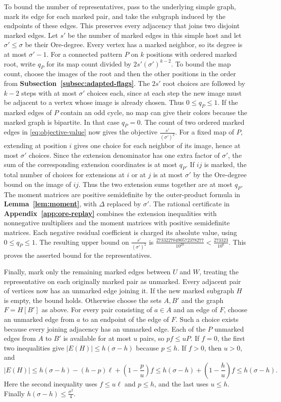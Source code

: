 \documentclass[preprint,11pt,numbers]{elsarticle-arxiv}
\numberwithin{equation}{section}
\theoremstyle{definition}
\begin{document}
To bound the number of representatives, pass to the underlying simple
graph, mark its edge for each marked pair, and take the subgraph
induced by the endpoints of these edges.
This preserves every adjacency that joins two disjoint marked edges.
Let $s'$ be the number of marked edges in this simple host and let
$\sigma'\leq\sigma$ be their Ore-degree. Every vertex has a marked
neighbor, so its degree is at most $\sigma'-1$. For a connected
pattern $P$ on $k$ positions with ordered marked root, write $q_P$
for its map count divided by $2s'(\sigma')^{k-2}$. To bound the map
count, choose the images of the root and then the other positions in
the order from \textbf{Subsection~\ref{subsec:adapted-flags}}.
The $2s'$ root choices are followed by $k-2$ steps with at most
$\sigma'$ choices each, since at each step the new image must be
adjacent to a vertex whose image is already chosen. Thus
$0\leq q_P\leq1$. If the marked edges of $P$ contain an odd cycle,
no map can give their colors because the marked graph is bipartite.
In that case $q_P=0$.
The count of two ordered marked edges in \eqref{eq:objective-value}
now gives the objective $\frac{s'}{(\sigma')^2}$.
For a fixed map of $P$, extending at position $i$ gives one
choice for each neighbor of its image, hence at most $\sigma'$
choices. Since the extension denominator has one extra factor
of $\sigma'$, the sum of the corresponding extension coordinates
is at most $q_P$. If $ij$ is marked, the total number of choices
for extensions at $i$ or at $j$ is at most $\sigma'$ by the
Ore-degree bound on the image of $ij$. Thus the two extension
sums together are at most $q_P$. The moment matrices are positive
semidefinite by the outer-product formula in
\textbf{Lemma~\ref{lem:moment}}, with $\Delta$ replaced by $\sigma'$.
The rational certificate in
\textbf{Appendix~\ref{app:ore-replay}} combines the extension inequalities
with nonnegative multipliers and the moment matrices with
positive semidefinite matrices. Each negative residual coefficient
is charged its absolute value, using $0\leq q_P\leq1$. The resulting
upper bound on $\frac{s'}{(\sigma')^2}$ is
$\frac{27332270490572378277}{10^{20}}<\frac{273323}{10^6}$.
This proves the asserted bound for the representatives.

Finally, mark only the remaining marked edges between $U$ and $W$,
treating the representative on each originally marked pair as unmarked.
Every adjacent pair of vertices now has an unmarked edge joining it.
If the new marked subgraph $H$ is empty, the bound holds. Otherwise
choose the sets $A,B'$ and the graph $F=H[B']$ as above. For every
pair consisting of $a\in A$ and an edge of $F$, choose an unmarked
edge from $a$ to an endpoint of the edge of $F$. Such a choice
exists because every joining adjacency has an unmarked edge.
Each of the $P$ unmarked edges from $A$ to $B'$ is available for
at most $u$ pairs, so $pf\leq uP$.
If $f=0$, the first two inequalities give $|E(H)|\leq
h(\sigma-h)$ because $p\leq h$. If $f>0$, then $u>0$, and
\[
 |E(H)|\leq h(\sigma-h)-(h-p)\ell+
          \left(1-\frac pu\right)f
 \leq h(\sigma-h)+\left(1-\frac hu\right)f
 \leq h(\sigma-h).
\]
Here the second inequality uses $f\leq u\ell$ and $p\leq h$,
and the last uses $u\leq h$. Finally $h(\sigma-h)\leq
\frac{\sigma^2}{4}$.
\end{document}
